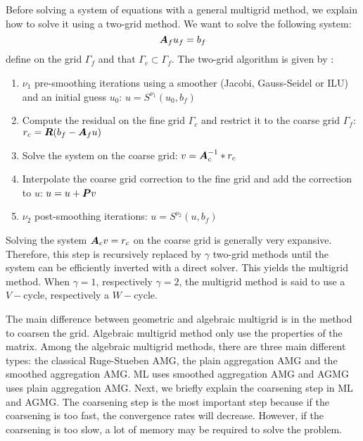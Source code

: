Before solving a system of equations with a general multigrid method, we
explain how to solve it using a two-grid method. We want to
solve the following system:
\begin{equation}
  \boldsymbol{A}_f u_f = b_f
\end{equation}
define on the grid $\Gamma_f$ and that $\Gamma_c \subset \Gamma_f$. The 
two-grid algorithm is given by :
\begin{enumerate}
  \item $\nu_1$ pre-smoothing iterations using a smoother (Jacobi,
    Gauss-Seidel or ILU) and an initial guess $u_0$: $u = S^{\nu_1}(u_0,b_f)$
  \item Compute the residual on the fine grid $\Gamma_c$ and restrict it to
    the coarse grid $\Gamma_f$: $r_c = \boldsymbol{R}(b_f-\boldsymbol{A}_f u)$
  \item Solve the system on the coarse grid: $v=\boldsymbol{A}_c^{-1}*r_c$
  \item Interpolate the coarse grid correction to the fine grid and add the
    correction to $u$: $u=u+\boldsymbol{P}v$
  \item $\nu_2$ post-smoothing iterations: $u = S^{\nu_2}(u,b_f)$
\end{enumerate}
Solving the system $\boldsymbol{A}_c v = r_c$ on the coarse grid is generally very
expansive. Therefore, this step is recursively replaced by $\gamma$ two-grid
methods until the system can be efficiently inverted with a direct solver.
This yields the multigrid method. When $\gamma = 1$, respectively $\gamma =
2$, the multigrid method is said to use a $V-$cycle, respectively a $W-$cycle.

The main difference between geometric and algebraic multigrid is in the method
to coarsen the grid. Algebraic multigrid method only use the properties of the
matrix. Among the algebraic multigrid methods, there are three main different 
types: the classical Ruge-Stueben AMG, the plain aggregation AMG and the
smoothed aggregation AMG. ML uses smoothed aggregation AMG and AGMG
uses plain aggregation AMG. Next, we briefly explain the coarsening step in
ML and AGMG. The coarsening step is the most important 
step because if the coarsening is too fast, the convergence rates will 
decrease. However, if the coarsening is too slow, a lot of memory may be 
required to solve the problem. 

